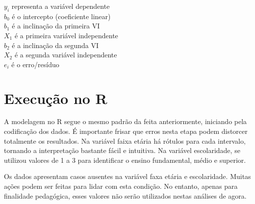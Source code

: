 \documentclass[
]{book}
\newenvironment{Shaded}{\begin{snugshade}}{\end{snugshade}}
\newcommand{\DataTypeTok}[1]{\textcolor[rgb]{0.13,0.29,0.53}{#1}}
\newcommand{\KeywordTok}[1]{\textcolor[rgb]{0.13,0.29,0.53}{\textbf{#1}}}
\newcommand{\NormalTok}[1]{#1}
\newcommand{\OperatorTok}[1]{\textcolor[rgb]{0.81,0.36,0.00}{\textbf{#1}}}
\newcommand{\StringTok}[1]{\textcolor[rgb]{0.31,0.60,0.02}{#1}}
\begin{document}
\(y_i\) representa a variável dependente\\
\(b_0\) é o intercepto (coeficiente linear)\\
\(b_1\) é a inclinação da primeira VI\\
\(X_1\) é a primeira variável independente\\
\(b_2\) é a inclinação da segunda VI\\
\(X_2\) é a segunda variável independente\\
\(e_i\) é o erro/resíduo

\hypertarget{execuuxe7uxe3o-no-r-7}{%
\section{Execução no R}\label{execuuxe7uxe3o-no-r-7}}

A modelagem no R segue o mesmo padrão da feita anteriormente, iniciando
pela codificação dos dados. É importante frisar que erros nesta etapa
podem distorcer totalmente os resultados. Na variável faixa etária há
rótulos para cada intervalo, tornando a interpretação bastante fácil e
intuitiva. Na variável escolaridade, se utilizou valores de 1 a 3 para
identificar o ensino fundamental, médio e superior.

\begin{Shaded}
\end{Shaded}

Os dados apresentam casos ausentes na variável faxa etária e
escolaridade. Muitas ações podem ser feitas para lidar com esta
condição. No entanto, apenas para finalidade pedagógica, esses valores
não serão utilizados nestas análises de agora.

\begin{Shaded}
\end{Shaded}
\end{document}
